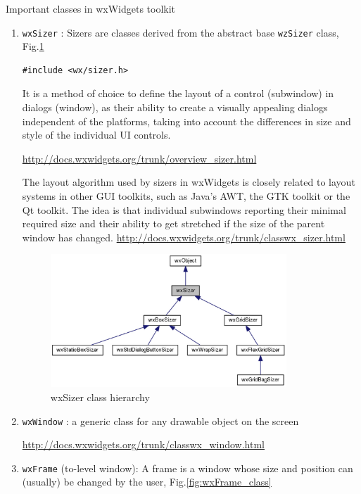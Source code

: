 Important classes in wxWidgets toolkit
\begin{enumerate}
  \item \verb!wxSizer! : Sizers are classes derived from the abstract 
  base \verb!wzSizer! class, Fig.\ref{fig:wxSizer_class}
  
\begin{verbatim}
#include <wx/sizer.h>
\end{verbatim}  
  It is a method of choice to define the layout of a control (subwindow) in dialogs (window), 
  as their ability to create a visually appealing
  dialogs independent of the platforms, taking into account the differences in size and 
  style of the individual UI controls.
  
  \url{http://docs.wxwidgets.org/trunk/overview_sizer.html}
  
  The layout algorithm used by sizers in wxWidgets is closely related to layout
  systems in other GUI toolkits, such as Java's AWT, the GTK toolkit or the Qt
  toolkit.
  The idea is that individual subwindows reporting their minimal required size
  and their ability to get stretched if the size of the parent window has
  changed.
\url{http://docs.wxwidgets.org/trunk/classwx_sizer.html}

\begin{figure}[hbt]
  \centerline{\includegraphics[height=5cm,
    angle=0]{./images/wxSizer_class.eps}}
\caption{wxSizer class hierarchy}
\label{fig:wxSizer_class}
\end{figure}  
  
  
  \item \verb!wxWindow! : a generic class for any drawable object on the screen
  
  \url{http://docs.wxwidgets.org/trunk/classwx_window.html}
  
  \item \verb!wxFrame! (to-level window): A frame is a window whose size and
  position can (usually) be changed by the user, Fig.\ref{fig:wxFrame_class}
  

\end{enumerate}
